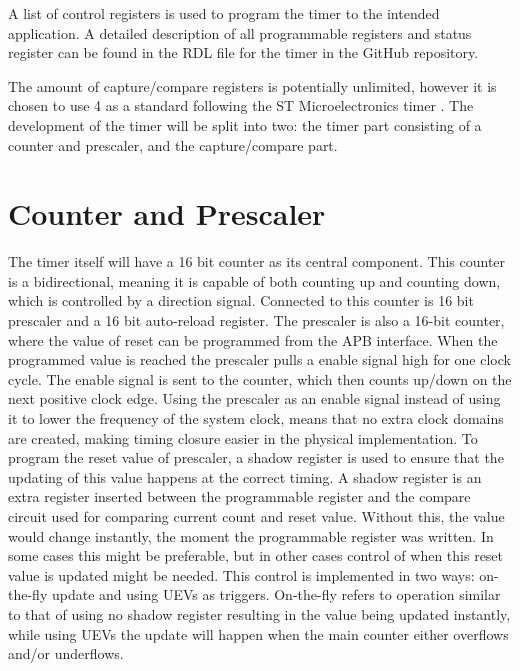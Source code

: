 \documentclass[./dissertation.tex]{subfiles}
\begin{document}
A list of control registers is used to program the timer to the intended application. A detailed description of all programmable registers and status register can be found in the RDL file for the timer in the GitHub repository.

The amount of capture/compare registers is potentially unlimited, however it is chosen to use 4 as a standard following the ST Microelectronics timer \cite{TimerManualSTM}. The development of the timer will be split into two: the timer part consisting of a counter and prescaler, and the capture/compare part.

\section{Counter and Prescaler}
The timer itself will have a 16 bit counter as its central component. This counter is a bidirectional, meaning it is capable of both counting up and counting down, which is controlled by a direction signal. Connected to this counter is 16 bit prescaler and a 16 bit auto-reload register. The prescaler is also a 16-bit counter, where the value of reset can be programmed from the APB interface. When the programmed value is reached the prescaler pulls a enable signal high for one clock cycle. The enable signal is sent to the counter, which then counts up/down on the next positive clock edge. Using the prescaler as an enable signal instead of using it to lower the frequency of the system clock, means that no extra clock domains are created, making timing closure easier in the physical implementation. To program the reset value of prescaler, a shadow register is used to ensure that the updating of this value happens at the correct timing. A shadow register is an extra register inserted between the programmable register and the compare circuit used for comparing current count and reset value. Without this, the value would change instantly, the moment the programmable register was written. In some cases this might be preferable, but in other cases control of when this reset value is updated might be needed. This control is implemented in two ways: on-the-fly update and using UEVs as triggers. On-the-fly refers to operation similar to that of using no shadow register resulting in the value being updated instantly, while using UEVs the update will happen when the main counter either overflows and/or underflows.
\end{document}
